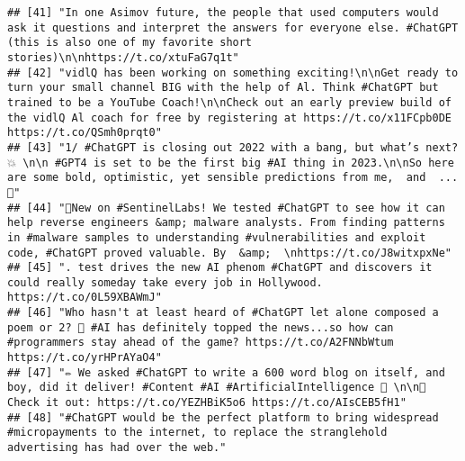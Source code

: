 \documentclass[
]{article}
\begin{document}
\begin{verbatim}
## [41] "In one Asimov future, the people that used computers would ask it questions and interpret the answers for everyone else. #ChatGPT (this is also one of my favorite short stories)\n\nhttps://t.co/xtuFaG7q1t"                                                                                                                         
## [42] "vidlQ has been working on something exciting!\n\nGet ready to turn your small channel BIG with the help of Al. Think #ChatGPT but trained to be a YouTube Coach!\n\nCheck out an early preview build of the vidlQ Al coach for free by registering at https://t.co/x11FCpb0DE https://t.co/QSmh0prqt0"                                
## [43] "1/ #ChatGPT is closing out 2022 with a bang, but what’s next? 💥 \n\n #GPT4 is set to be the first big #AI thing in 2023.\n\nSo here are some bold, optimistic, yet sensible predictions from me,  and  ... 👀"                                                                                                                       
## [44] "🤖New on #SentinelLabs! We tested #ChatGPT to see how it can help reverse engineers &amp; malware analysts. From finding patterns in #malware samples to understanding #vulnerabilities and exploit code, #ChatGPT proved valuable. By  &amp;  \nhttps://t.co/J8witxpxNe"                                                             
## [45] ". test drives the new AI phenom #ChatGPT and discovers it could really someday take every job in Hollywood. https://t.co/0L59XBAWmJ"                                                                                                                                                                                                  
## [46] "Who hasn't at least heard of #ChatGPT let alone composed a poem or 2? 🙋 #AI has definitely topped the news...so how can #programmers stay ahead of the game? https://t.co/A2FNNbWtum https://t.co/yrHPrAYaO4"                                                                                                                        
## [47] "✏️ We asked #ChatGPT to write a 600 word blog on itself, and boy, did it deliver! #Content #AI #ArtificialIntelligence 📃 \n\n🤖 Check it out: https://t.co/YEZHBiK5o6 https://t.co/AIsCEB5fH1"                                                                                                                                        
## [48] "#ChatGPT would be the perfect platform to bring widespread #micropayments to the internet, to replace the stranglehold advertising has had over the web."                                                                                                                                                                             

\end{verbatim}
\end{document}
